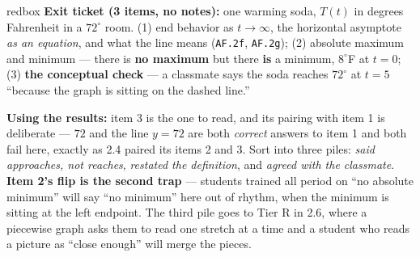 \documentclass[10pt]{article}
\begin{document}
\boxguard[16]
\begin{skillbox}{redbox}
\textbf{Exit ticket (3 items, no notes):} one warming soda, $T(t)$ in degrees Fahrenheit in a
$72^\circ$ room. (1) end behavior as $t \to \infty$, the horizontal asymptote \emph{as an equation},
and what the line means (\texttt{AF.2f}, \texttt{AF.2g}); (2) absolute maximum and minimum --- there
is \textbf{no maximum} but there \textbf{is} a minimum, $8^\circ$F at $t=0$; (3) \textbf{the
conceptual check} --- a classmate says the soda reaches $72^\circ$ at $t=5$ ``because the graph is
sitting on the dashed line.''

\textbf{Using the results:} item 3 is the one to read, and its pairing with item 1 is deliberate ---
$72$ and the line $y=72$ are both \emph{correct} answers to item 1 and both fail here, exactly as 2.4
paired its items 2 and 3. Sort into three piles: \emph{said approaches, not reaches}, \emph{restated
the definition}, and \emph{agreed with the classmate}. \textbf{Item 2's flip is the second trap} ---
students trained all period on ``no absolute minimum'' will say ``no minimum'' here out of rhythm,
when the minimum is sitting at the left endpoint. The third pile goes to Tier R in 2.6, where a
piecewise graph asks them to read one stretch at a time and a student who reads a picture as ``close
enough'' will merge the pieces.
\end{skillbox}
\end{document}
